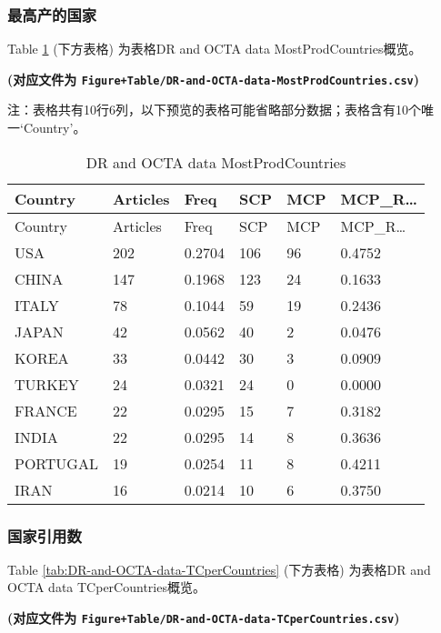 \documentclass[
]{article}
\begin{document}
\hypertarget{ux6700ux9ad8ux4ea7ux7684ux56fdux5bb6}{%
\subsubsection{最高产的国家}\label{ux6700ux9ad8ux4ea7ux7684ux56fdux5bb6}}

Table \ref{tab:DR-and-OCTA-data-MostProdCountries} (下方表格) 为表格DR and OCTA data MostProdCountries概览。

\textbf{(对应文件为 \texttt{Figure+Table/DR-and-OCTA-data-MostProdCountries.csv})}

\begin{center}\begin{tcolorbox}[colback=gray!10, colframe=gray!50, width=0.9\linewidth, arc=1mm, boxrule=0.5pt]注：表格共有10行6列，以下预览的表格可能省略部分数据；表格含有10个唯一`Country'。
\end{tcolorbox}
\end{center}

\begin{longtable}[]{@{}llllll@{}}
\caption{\label{tab:DR-and-OCTA-data-MostProdCountries}DR and OCTA data MostProdCountries}\tabularnewline
\toprule
Country & Articles & Freq & SCP & MCP & MCP\_R\ldots{}\tabularnewline
\midrule
\endfirsthead
\toprule
Country & Articles & Freq & SCP & MCP & MCP\_R\ldots{}\tabularnewline
\midrule
\endhead
USA & 202 & 0.2704 & 106 & 96 & 0.4752\tabularnewline
CHINA & 147 & 0.1968 & 123 & 24 & 0.1633\tabularnewline
ITALY & 78 & 0.1044 & 59 & 19 & 0.2436\tabularnewline
JAPAN & 42 & 0.0562 & 40 & 2 & 0.0476\tabularnewline
KOREA & 33 & 0.0442 & 30 & 3 & 0.0909\tabularnewline
TURKEY & 24 & 0.0321 & 24 & 0 & 0.0000\tabularnewline
FRANCE & 22 & 0.0295 & 15 & 7 & 0.3182\tabularnewline
INDIA & 22 & 0.0295 & 14 & 8 & 0.3636\tabularnewline
PORTUGAL & 19 & 0.0254 & 11 & 8 & 0.4211\tabularnewline
IRAN & 16 & 0.0214 & 10 & 6 & 0.3750\tabularnewline
\bottomrule
\end{longtable}

\hypertarget{ux56fdux5bb6ux5f15ux7528ux6570}{%
\subsubsection{国家引用数}\label{ux56fdux5bb6ux5f15ux7528ux6570}}

Table \ref{tab:DR-and-OCTA-data-TCperCountries} (下方表格) 为表格DR and OCTA data TCperCountries概览。

\textbf{(对应文件为 \texttt{Figure+Table/DR-and-OCTA-data-TCperCountries.csv})}
\end{document}
